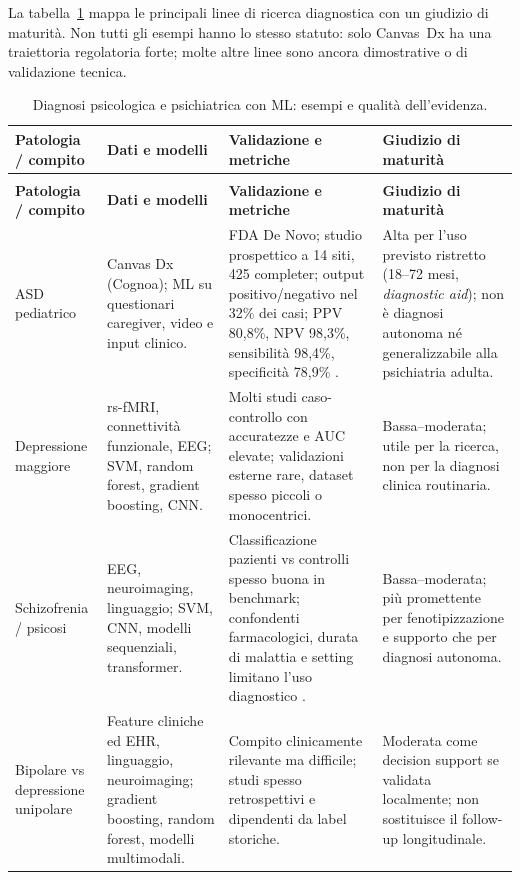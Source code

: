 \documentclass[11pt,a4paper]{article}
\begin{document}
La tabella~\ref{tab:diagnosi} mappa le principali linee di ricerca diagnostica con un giudizio di maturità. Non tutti gli esempi hanno lo stesso statuto: solo Canvas~Dx ha una traiettoria regolatoria forte; molte altre linee sono ancora dimostrative o di validazione tecnica.

\begin{longtable}{>{\RaggedRight}p{2.5cm} >{\RaggedRight}p{3.6cm} >{\RaggedRight}p{4.0cm} >{\RaggedRight}p{3.5cm}}
\caption{Diagnosi psicologica e psichiatrica con ML: esempi e qualità dell'evidenza.}
\label{tab:diagnosi}\\
\toprule
\textbf{Patologia / compito} & \textbf{Dati e modelli} & \textbf{Validazione e metriche} & \textbf{Giudizio di maturità} \\
\midrule
\endfirsthead
\multicolumn{4}{l}{\footnotesize\itshape Tabella \ref{tab:diagnosi} (continua)}\\
\toprule
\textbf{Patologia / compito} & \textbf{Dati e modelli} & \textbf{Validazione e metriche} & \textbf{Giudizio di maturità} \\
\midrule
\endhead
\bottomrule
\endlastfoot
\small ASD pediatrico & \small Canvas Dx (Cognoa); ML su questionari caregiver, video e input clinico. & \small FDA De Novo; studio prospettico a 14 siti, 425 completer; output positivo/negativo nel 32\% dei casi; PPV 80,8\%, NPV 98,3\%, sensibilità 98,4\%, specificità 78,9\% \cite{fda-cognoa}. & \small Alta per l'uso previsto ristretto (18--72 mesi, \emph{diagnostic aid}); non è diagnosi autonoma né generalizzabile alla psichiatria adulta. \\
\addlinespace
\small Depressione maggiore & \small rs-fMRI, connettività funzionale, EEG; SVM, random forest, gradient boosting, CNN. & \small Molti studi caso-controllo con accuratezze e AUC elevate; validazioni esterne rare, dataset spesso piccoli o monocentrici. & \small Bassa--moderata; utile per la ricerca, non per la diagnosi clinica routinaria. \\
\addlinespace
\small Schizofrenia / psicosi & \small EEG, neuroimaging, linguaggio; SVM, CNN, modelli sequenziali, transformer. & \small Classificazione pazienti vs controlli spesso buona in benchmark; confondenti farmacologici, durata di malattia e setting limitano l'uso diagnostico \cite{koutsouleris2021}. & \small Bassa--moderata; più promettente per fenotipizzazione e supporto che per diagnosi autonoma. \\
\addlinespace
\small Bipolare vs depressione unipolare & \small Feature cliniche ed EHR, linguaggio, neuroimaging; gradient boosting, random forest, modelli multimodali. & \small Compito clinicamente rilevante ma difficile; studi spesso retrospettivi e dipendenti da label storiche. & \small Moderata come decision support se validata localmente; non sostituisce il follow-up longitudinale. \\

\end{longtable}
\end{document}
